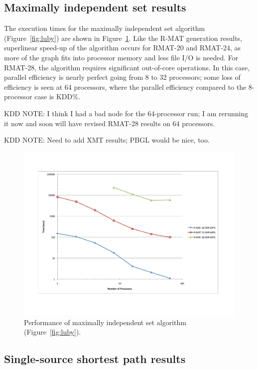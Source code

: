 \subsection{Maximally independent set results}

The execution times for the maximally independent set algorithm
(Figure~\ref{fig:luby}) are shown in Figure~\ref{f:luby}.  Like the R-MAT
generation results, superlinear speed-up of the algorithm occurs for RMAT-20
and RMAT-24, as more of the graph fits into processor memory and less file
I/O is needed.  For RMAT-28, the algorithm requires significant out-of-core
operations. In this case, parallel efficiency is nearly perfect going from 
8 to 32 processors; some loss of efficiency is seen at 64 processors,
where the parallel efficiency compared to the 8-processor case is KDD\%.

KDD NOTE:  I think I had a bad node for the 64-processor run; I am 
rerunning it now and soon will have revised RMAT-28 results on 64 processors.

KDD NOTE:  Need to add XMT results; PBGL would be nice, too.

\begin{figure}[htb]
\includegraphics[width=\textwidth]{fig_luby.pdf}
\caption{Performance of maximally independent set algorithm (Figure~\ref{fig:luby}).}
\label{f:luby}
\end{figure}

\subsection{Single-source shortest path results}

